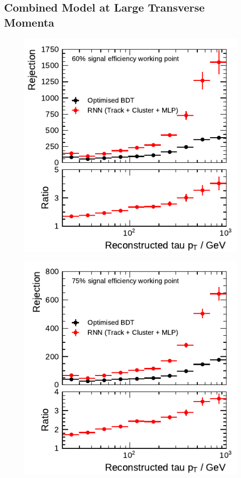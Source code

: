 \clearpage
\subsection{Combined Model at Large Transverse Momenta}

\noindent
\begin{minipage}{\textwidth}
  \captionsetup{type=figure}
  \centering
  \begin{subfigure}[t]{0.48\textwidth}
    \centering
    \includegraphics{./figures/rnn/combined/highpt/rnn_tight_1p.pdf}
  \end{subfigure}\hfill
  \begin{subfigure}[t]{0.48\textwidth}
    \centering
    \includegraphics{./figures/rnn/combined/highpt/rnn_medium_1p.pdf}

\end{subfigure}
\end{minipage}
